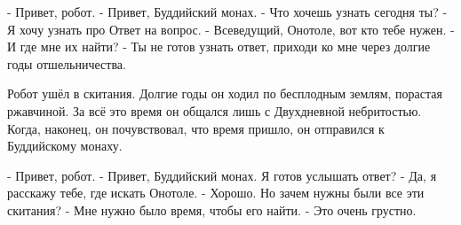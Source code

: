 - Привет, робот.
- Привет, Буддийский монах.
- Что хочешь узнать сегодня ты?
- Я хочу узнать про Ответ на вопрос.
- Всеведущий, Онотоле, вот кто тебе нужен.
- И где мне их найти?
- Ты не готов узнать ответ, приходи ко мне через долгие годы отшельничества.

Робот ушёл в скитания. Долгие годы он ходил по бесплодным землям, порастая ржавчиной. За всё это время он общался лишь с Двухдневной небритостью. Когда, наконец, он почувствовал, что время пришло, он отправился к Буддийскому монаху.

- Привет, робот.
- Привет, Буддийский монах. Я готов услышать ответ?
- Да, я расскажу тебе, где искать Онотоле.
- Хорошо. Но зачем нужны были все эти скитания?
- Мне нужно было время, чтобы его найти.
- Это очень грустно.